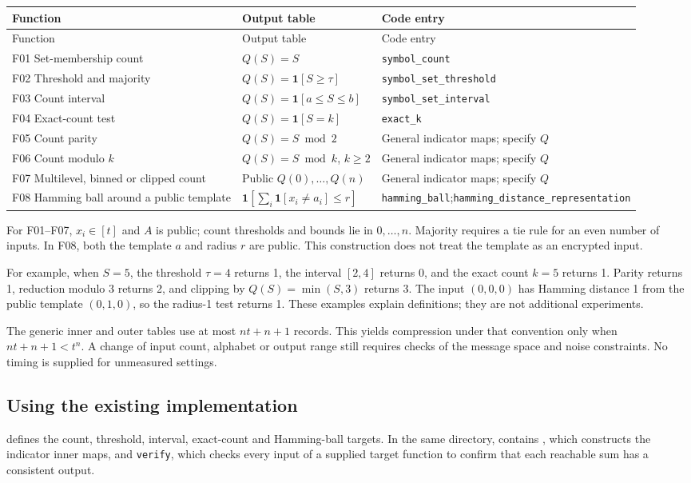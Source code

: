 \documentclass[a4paper,10pt]{article}
\newcommand{\ind}{\mathbf{1}}
\begin{document}
\begin{longtable}{@{}p{43mm}p{52mm}p{65mm}@{}}
\toprule
Function & Output table & Code entry\\\midrule
\endfirsthead
\toprule
Function & Output table & Code entry\\\midrule
\endhead
F01 Set-membership count & $Q(S)=S$ & \texttt{symbol\_count}\\
F02 Threshold and majority & $Q(S)=\ind[S\ge\tau]$ & \texttt{symbol\_set\_threshold}\\
F03 Count interval & $Q(S)=\ind[a\le S\le b]$ & \texttt{symbol\_set\_interval}\\
F04 Exact-count test & $Q(S)=\ind[S=k]$ & \texttt{exact\_k}\\
F05 Count parity & $Q(S)=S\bmod2$ & General indicator maps; specify $Q$\\
F06 Count modulo $k$ & $Q(S)=S\bmod k$, $k\ge2$ & General indicator maps; specify $Q$\\
F07 Multilevel, binned or clipped count & Public $Q(0),\ldots,Q(n)$ & General indicator maps; specify $Q$\\
F08 Hamming ball around a public template & $\ind[\sum_i\ind[x_i\ne a_i]\le r]$ & \texttt{hamming\_ball};\newline\texttt{hamming\_distance\_representation}\\
\bottomrule\end{longtable}

For F01--F07, $x_i\in[t]$ and $A$ is public; count thresholds and bounds lie in $0,\ldots,n$. Majority requires a tie rule for an even number of inputs. In F08, both the template $a$ and radius $r$ are public. This construction does not treat the template as an encrypted input.

For example, when $S=5$, the threshold $\tau=4$ returns 1, the interval $[2,4]$ returns 0, and the exact count $k=5$ returns 1. Parity returns 1, reduction modulo 3 returns 2, and clipping by $Q(S)=\min(S,3)$ returns 3. The input $(0,0,0)$ has Hamming distance 1 from the public template $(0,1,0)$, so the radius-1 test returns 1. These examples explain definitions; they are not additional experiments.

The generic inner and outer tables use at most $nt+n+1$ records. This yields compression under that convention only when $nt+n+1<t^n$. A change of input count, alphabet or output range still requires checks of the message space and noise constraints. No timing is supplied for unmeasured settings.

\subsection{Using the existing implementation}
 defines the count, threshold, interval, exact-count and Hamming-ball targets. In the same directory,  contains , which constructs the indicator inner maps, and \texttt{verify}, which checks every input of a supplied target function to confirm that each reachable sum has a consistent output.
\end{document}

